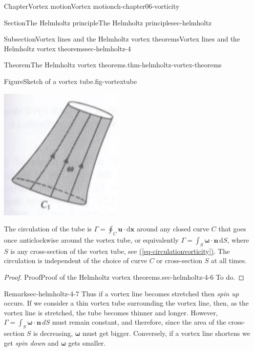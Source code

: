 \documentclass[oneside,10pt,]{book}
\newcommand{\xreffont}{\relax}
\numberwithin{equation}{section}
\newcommand{\de}{\mathrm{d}}
\newcommand{\bx}{\boldsymbol{x}}
\newcommand{\bn}{\boldsymbol{n}}
\newcommand{\bu}{\boldsymbol{u}}
\newcommand{\bomega}{\boldsymbol{\omega}}
\begin{document}
\begin{chapterptx}{Chapter}{Vortex motion}{}{Vortex motion}{}{}{ch-chapter06-vorticity}
\begin{sectionptx}{Section}{The Helmholtz principle}{}{The Helmholtz principle}{}{}{sec-helmholtz}
\begin{subsectionptx}{Subsection}{Vortex lines and the Helmholtz vortex theorems}{}{Vortex lines and the Helmholtz vortex theorems}{}{}{sec-helmholtz-4}
\begin{theorem}{Theorem}{The Helmholtz vortex theorems.}{}{thm-helmholtz-vortex-theorems}
\begin{enumerate}
\begin{figureptx}{Figure}{Sketch of a vortex tube.}{fig-vortextube}{}
\begin{image}{0.25}{0.5}{0.25}{}
\includegraphics[width=\linewidth]{external/ch-chapter06-vortextube.jpg}
\end{image}%
\tcblower
\end{figureptx}%
The circulation of the tube is \(\Gamma=\oint_C\bu\cdot \de{\bx}\) around any closed curve \(C\) that goes once anticlockwise around the vortex tube, or equivalently \(\Gamma=\int_S\bomega\cdot{\bn}\,\de S\), where \(S\) is any cross-section of the vortex tube, see \hyperref[eq-circulationvorticity]{({\xreffont\ref{eq-circulationvorticity}})}. The circulation is independent of the choice of curve \(C\) or cross-section \(S\) at all times.%
\end{enumerate}
%
\end{theorem}
\begin{proof}{Proof}{Proof of the Helmholtz vortex theorems.}{sec-helmholtz-4-6}
To do.%
\end{proof}
\begin{remark}{Remark}{}{sec-helmholtz-4-7}%
Thus if a vortex line becomes stretched then \emph{spin up} occurs. If we consider a thin vortex tube surrounding the vortex line, then, as the vortex line is stretched, the tube becomes thinner and longer. However, \(\Gamma=\int_S\bomega\cdot{\bn}\,dS\) must remain constant, and therefore, since the area of the cross-section \(S\) is decreasing, \(\bomega\) must get bigger. Conversely, if a vortex line shortens we get \emph{spin down} and \(\bomega\) gets smaller.%

\end{remark}
\end{subsectionptx}
\end{sectionptx}
\end{chapterptx}
\end{document}
